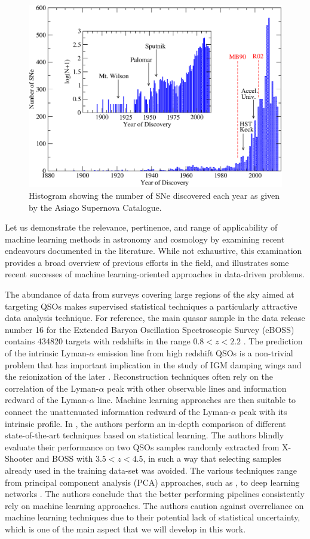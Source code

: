 \begin{figure}
    \centering
    \includegraphics[width=0.7\linewidth]{img//ML/fig1_color.pdf}
    \caption{Histogram showing the number of SNe discovered each year as given by the Asiago Supernova Catalogue.}
    \label{fig:Supernovas_per_year}
\end{figure}



Let us demonstrate the relevance, pertinence, and range of applicability of machine learning methods in astronomy and cosmology by examining recent endeavours documented in the literature. While not exhaustive, this examination provides a broad overview of previous efforts in the field, and illustrates some recent successes of machine learning-oriented approaches in data-driven problems.
\par
The abundance of data from surveys covering large regions of the sky aimed at targeting QSOs makes supervised statistical techniques a particularly attractive data analysis technique. For reference, the main quasar sample in the data release number 16 for the Extended Baryon Oscillation Spectroscopic Survey (eBOSS) contains 434820 targets with redshifts in the range $0.8<z<2.2$ \cite{eboss}. The prediction of the intrinsic Lyman-$\alpha$ emission line from high redshift QSOs is a non-trivial problem that has important implication in the study of IGM damping wings and the reionization of the later \cite{MiraldaEscude_IGM}. Reconstruction techniques often rely on the correlation of the Lyman-$\alpha$ peak with other observable lines and information redward of the Lyman-$\alpha$ line. Machine learning approaches are then suitable to connect the unattenuated information redward of the Lyman-$\alpha$ peak with its intrinsic profile. In  \cite{qso_challenge}, the authors perform an in-depth comparison of different state-of-the-art techniques based on statistical learning. The authors blindly evaluate their performance on two QSOs samples randomly extracted from X-Shooter and BOSS with $3.5<z<4.5$, in such a way that selecting samples already used in the training data-set was avoided. The various techniques range from principal component analysis (PCA) approaches, such as \cite{Bosman2021_pca}, to deep learning networks \cite{Liu2021}. The authors conclude that the better performing pipelines consistently rely on machine learning approaches. The authors caution against overreliance on machine learning techniques due to their potential lack of statistical uncertainty, which is one of the main aspect that we will develop in this work.



